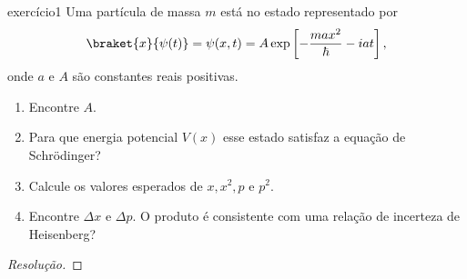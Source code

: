 \begin{exercício}{}{exercício1}
    Uma partícula de massa \(m\) está no estado representado por
    \begin{equation*}
        \braket{x}{\psi(t)} = \psi(x,t) = A\exp\left[-\frac{max^2}{\hbar} - iat\right],
    \end{equation*}
    onde \(a\) e \(A\) são constantes reais positivas.
    \begin{enumerate}[label=(\alph*)]
        \item Encontre \(A\).
        \item Para que energia potencial \(V(x)\) esse estado satisfaz a equação de Schrödinger?
        \item Calcule os valores esperados de \(x, x^2, p\) e \(p^2\).
        \item Encontre \(\Delta x\) e \(\Delta p\). O produto é consistente com uma relação de incerteza de Heisenberg?
    \end{enumerate}
\end{exercício}
\begin{proof}[Resolução]

\end{proof}

